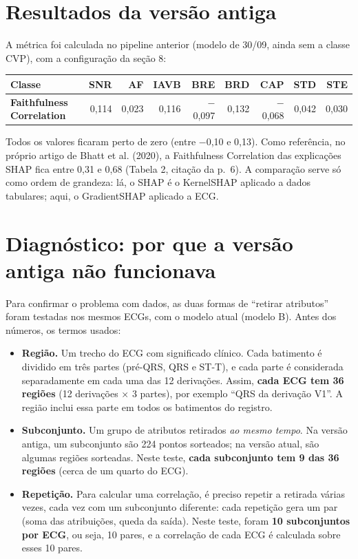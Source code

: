 \documentclass[11pt,a4paper]{article}
\begin{document}
\section{Resultados da versão antiga}
A métrica foi calculada no pipeline anterior (modelo de 30/09, ainda sem a classe CVP), com a configuração da seção 8:
\begin{center}\small
\begin{tabularx}{\linewidth}{Xrrrrrrrr}
\toprule
\textbf{Classe} & SNR & AF & IAVB & BRE & BRD & CAP & STD & STE \\
\midrule
\textbf{Faithfulness Correlation} & 0,114 & 0,023 & 0,116 & $-$0,097 & 0,132 & $-$0,068 & 0,042 & 0,030 \\
\bottomrule
\end{tabularx}
\end{center}
Todos os valores ficaram perto de zero (entre $-$0,10 e 0,13). Como referência, no próprio artigo de Bhatt et al. (2020), a Faithfulness Correlation das explicações SHAP fica entre 0,31 e 0,68 (Tabela 2, citação da p.~6). A comparação serve só como ordem de grandeza: lá, o SHAP é o KernelSHAP aplicado a dados tabulares; aqui, o GradientSHAP aplicado a ECG.

\section{Diagnóstico: por que a versão antiga não funcionava}
Para confirmar o problema com dados, as duas formas de “retirar atributos” foram testadas nos mesmos ECGs, com o modelo atual (modelo B). Antes dos números, os termos usados:

\begin{itemize}
\item \textbf{Região.} Um trecho do ECG com significado clínico. Cada batimento é dividido em três partes (pré-QRS, QRS e ST-T), e cada parte é considerada separadamente em cada uma das 12 derivações. Assim, \textbf{cada ECG tem 36 regiões} (12 derivações × 3 partes), por exemplo “QRS da derivação V1”. A região inclui essa parte em todos os batimentos do registro.
\item \textbf{Subconjunto.} Um grupo de atributos retirados \textit{ao mesmo tempo}. Na versão antiga, um subconjunto são 224 pontos sorteados; na versão atual, são algumas regiões sorteadas. Neste teste, \textbf{cada subconjunto tem 9 das 36 regiões} (cerca de um quarto do ECG).
\item \textbf{Repetição.} Para calcular uma correlação, é preciso repetir a retirada várias vezes, cada vez com um subconjunto diferente: cada repetição gera um par (soma das atribuições, queda da saída). Neste teste, foram \textbf{10 subconjuntos por ECG}, ou seja, 10 pares, e a correlação de cada ECG é calculada sobre esses 10 pares.
\end{itemize}
\end{document}
